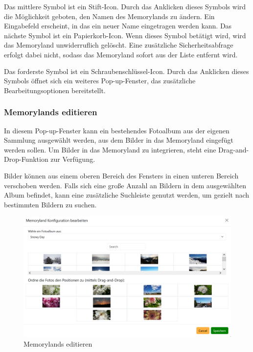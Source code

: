 Das mittlere Symbol ist ein Stift-Icon. Durch das Anklicken dieses Symbols wird 
die Möglichkeit geboten, den Namen des Memorylands zu ändern. Ein Eingabefeld 
erscheint, in das ein neuer Name eingetragen werden kann. Das nächste Symbol ist 
ein Papierkorb-Icon. Wenn dieses Symbol betätigt wird, wird das Memoryland 
unwiderruflich gelöscht. Eine zusätzliche Sicherheitsabfrage erfolgt dabei 
nicht, sodass das Memoryland sofort aus der Liste entfernt wird. 

Das forderste Symbol ist ein Schraubenschlüssel-Icon. Durch das Anklicken dieses 
Symbols öffnet sich ein weiteres Pop-up-Fenster, das zusätzliche Bearbeitungsoptionen 
bereitstellt. 

\subsubsection{Memorylands editieren}

In diesem Pop-up-Fenster kann ein bestehendes Fotoalbum aus der eigenen Sammlung 
ausgewählt werden, aus dem Bilder in das Memoryland eingefügt werden sollen. Um 
Bilder in das Memoryland zu integrieren, steht eine Drag-and-Drop-Funktion zur 
Verfügung. 

Bilder können aus einem oberen Bereich des Fensters in einen unteren 
Bereich verschoben werden. Falls sich eine gro\ss{}e Anzahl an Bildern in dem 
ausgewählten Album befindet, kann eine zusätzliche Suchleiste genutzt werden, 
um gezielt nach bestimmten Bildern zu suchen.

\begin{figure} [h t]
    \centering
    \includegraphics[scale=0.6]{pics/all_worlds_teil2_button.PNG}
    \caption{Memorylands editieren}
    \label{fig:all-worlds-memorylands-editieren}
\end{figure}


